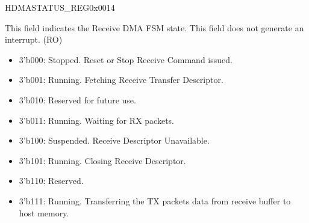 \begin{register}{H}{DMASTATUS\_REG}{0x0014}
\begin{regdesc}
\begin{reglist}
\item [RECV\_PROC\_STATE]This field indicates the Receive DMA FSM state. This field does not generate an interrupt. (RO)\begin{itemize}
\item 3'b000: Stopped. Reset or Stop Receive Command issued. \item 3'b001: Running. Fetching Receive Transfer Descriptor. \item 3'b010: Reserved for future use. \item 3'b011: Running. Waiting for RX packets. \item 3'b100: Suspended. Receive Descriptor Unavailable. \item 3'b101: Running. Closing Receive Descriptor. \item 3'b110: Reserved. \item 3'b111: Running. Transferring the TX packets data from receive buffer to host memory.\end{itemize}
\item [Continued on the next page...]
\end{reglist}\end{regdesc}
\end{register}

